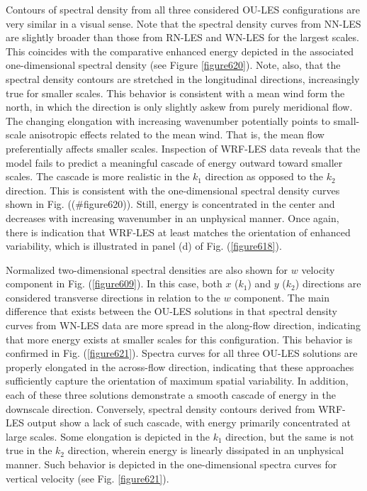 Contours of spectral density from all three considered OU-LES configurations are very similar in a visual sense. Note that the spectral density curves from NN-LES are slightly broader than those from RN-LES and WN-LES for the largest scales. This coincides with the comparative enhanced energy depicted in the associated one-dimensional spectral density (see Figure \autoref{figure620}). Note, also, that the spectral density contours are stretched in the longitudinal directions, increasingly true for smaller scales. This behavior is consistent with a mean wind form the north, in which the direction is only slightly askew from purely meridional flow. The changing elongation with increasing wavenumber potentially points to small-scale anisotropic effects related to the mean wind. That is, the mean flow preferentially affects smaller scales. Inspection of WRF-LES data reveals that the model fails to predict a meaningful cascade of energy outward toward smaller scales. The cascade is more realistic in the $k_1$ direction as opposed to the $k_2$ direction. This is consistent with the one-dimensional spectral density curves shown in Fig. ((\#figure620)). Still, energy is concentrated in the center and decreases with increasing wavenumber in an unphysical manner. Once again, there is indication that WRF-LES at least matches the orientation of enhanced variability, which is illustrated in panel (d) of Fig. (\autoref{figure618}).

Normalized two-dimensional spectral densities are also shown for $w$ velocity component in Fig. (\autoref{figure609}). In this case, both $x$ ($k_1$) and $y$ ($k_2$) directions are considered transverse directions in relation to the $w$ component. The main difference that exists between the OU-LES solutions in that spectral density curves from WN-LES data are more spread in the along-flow direction, indicating that more energy exists at smaller scales for this configuration. This behavior is confirmed in Fig. (\autoref{figure621}). Spectra curves for all three OU-LES solutions are properly elongated in the across-flow direction, indicating that these approaches sufficiently capture the orientation of maximum spatial variability. In addition, each of these three solutions demonstrate a smooth cascade of energy in the downscale direction. Conversely, spectral density contours derived from WRF-LES output show a lack of such cascade, with energy primarily concentrated at large scales. Some elongation is depicted in the $k_1$ direction, but the same is not true in the $k_2$ direction, wherein energy is linearly dissipated in an unphysical manner. Such behavior is depicted in the one-dimensional spectra curves for vertical velocity (see Fig. \autoref{figure621}). 



